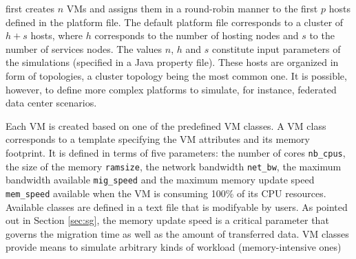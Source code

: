\vmps first creates $n$ VMs and assigns them in a round-robin manner
to the first $p$ hosts defined in the platform file.  The default
platform file corresponds to a cluster of $h+s$ hosts, where $h$
corresponds to the number of hosting nodes and $s$ to the number of
services nodes. The values $n$, $h$ and $s$ constitute input
parameters of the simulations (specified in a Java property file).
These hosts are organized in form of topologies, a cluster topology
being the most common one. It is possible, however, to define more
complex platforms to simulate, for instance, federated data center scenarios.

Each VM is created based on one of the predefined VM classes. A VM
class corresponds to a template specifying the VM attributes and its
memory footprint. It is
defined in terms of five parameters: the number of cores
\texttt{nb\_cpus}, the size of the memory \texttt{ramsize}, the
network bandwidth \texttt{net\_bw}, the maximum bandwidth available
\texttt{mig\_speed} and the maximum memory update speed
\texttt{mem\_speed} available when the VM is consuming 100\% of its
CPU resources.  Available classes are defined in a text file that is
modifyable by users.  As pointed out in Section \ref{sec:sg}, the
memory update speed is a critical parameter that governs the migration
time as well as the amount of transferred data.  VM classes provide
means to simulate arbitrary kinds of workload (\eg memory-intensive
ones) %


